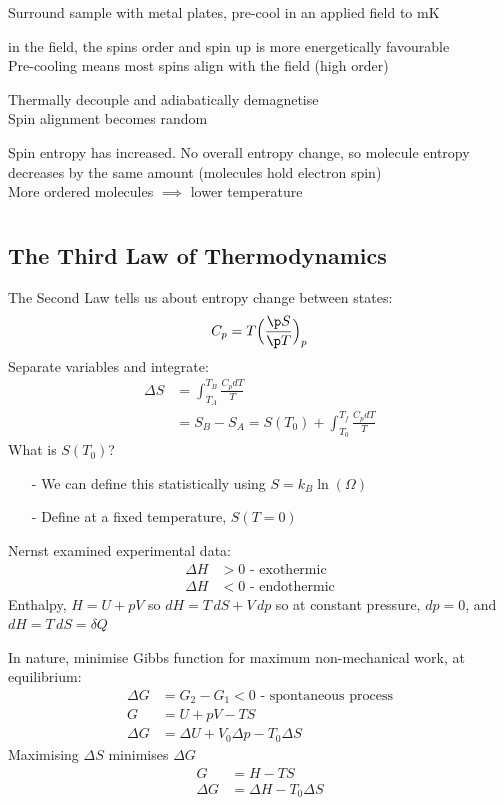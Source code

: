 \documentclass[a4paper, 11pt, normalem]{report}
\begin{document}
Surround sample with metal plates, pre-cool in an applied field to mK

in the field, the spins order and spin up is more energetically favourable \\
Pre-cooling means most spins align with the field (high order)

Thermally decouple and adiabatically demagnetise \\
Spin alignment becomes random

Spin entropy has increased. No overall entropy change, so molecule entropy decreases by the same amount (molecules hold electron spin) \\
More ordered molecules $\implies$ lower temperature

\chapter{}
\section{The Third Law of Thermodynamics}
The Second Law tells us about entropy change between states:
\begin{equation*}
    C_p = T\Big(\frac{\p S}{\p T}\Big)_p
\end{equation*}
Separate variables and integrate:
\begin{align*}
    \Delta S &= \int_{T_A}^{T_B} \frac{C_p dT}{T} \\
    &= S_B - S_A = S(T_0) + \int_{T_0}^{T_f} \frac{C_p dT}{T}
\end{align*}
What is $S(T_0)$?
\begin{itemize}
    \item[-] We can define this statistically using $S = k_B \ln(\Omega)$
    \item[-] Define at a fixed temperature, $S(T = 0)$
\end{itemize}
Nernst examined experimental data:
\begin{align*}
    \Delta H &> 0 \text{ - exothermic} \\
    \Delta H &< 0 \text{ - endothermic}
\end{align*}
Enthalpy, $H = U + pV$ so $dH = T\,dS + V\,dp$ so at constant pressure, $dp = 0$, and $dH = T\,dS = \delta Q$

In nature, minimise Gibbs function for maximum non-mechanical work, at equilibrium:
\begin{align*}
    \Delta G &= G_2 - G_1 < 0 \text{ - spontaneous process} \\
    G &= U + pV - TS \\
    \Delta G &= \Delta U + V_0 \Delta p - T_0 \Delta S
\end{align*}
Maximising $\Delta S$ minimises $\Delta G$
\begin{align*}
    G &= H - TS \\
    \Delta G &= \Delta H - T_0 \Delta S
\end{align*}
\end{document}
